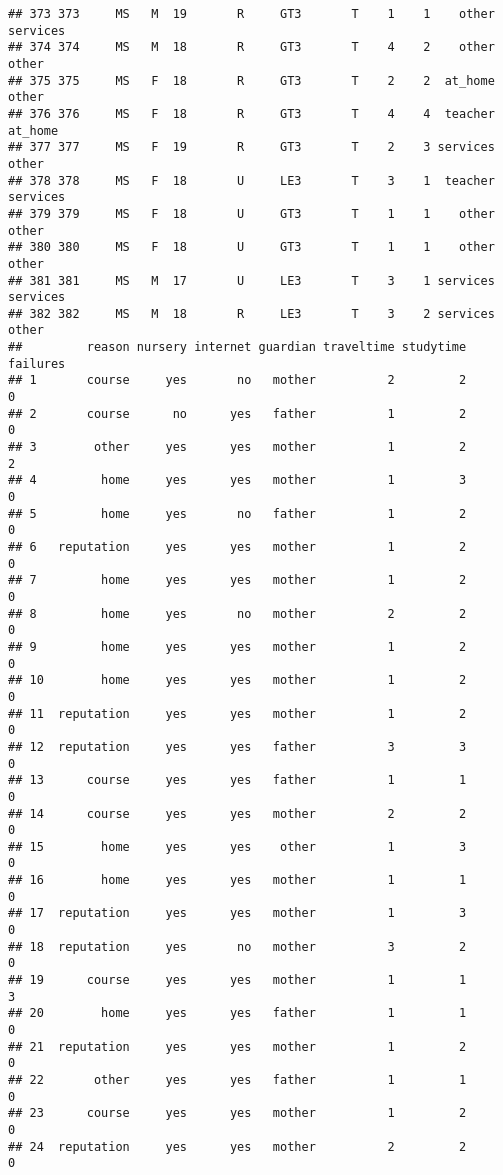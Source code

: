 \documentclass[]{article}
\begin{document}
\begin{verbatim}
## 373 373     MS   M  19       R     GT3       T    1    1    other services
## 374 374     MS   M  18       R     GT3       T    4    2    other    other
## 375 375     MS   F  18       R     GT3       T    2    2  at_home    other
## 376 376     MS   F  18       R     GT3       T    4    4  teacher  at_home
## 377 377     MS   F  19       R     GT3       T    2    3 services    other
## 378 378     MS   F  18       U     LE3       T    3    1  teacher services
## 379 379     MS   F  18       U     GT3       T    1    1    other    other
## 380 380     MS   F  18       U     GT3       T    1    1    other    other
## 381 381     MS   M  17       U     LE3       T    3    1 services services
## 382 382     MS   M  18       R     LE3       T    3    2 services    other
##         reason nursery internet guardian traveltime studytime failures
## 1       course     yes       no   mother          2         2        0
## 2       course      no      yes   father          1         2        0
## 3        other     yes      yes   mother          1         2        2
## 4         home     yes      yes   mother          1         3        0
## 5         home     yes       no   father          1         2        0
## 6   reputation     yes      yes   mother          1         2        0
## 7         home     yes      yes   mother          1         2        0
## 8         home     yes       no   mother          2         2        0
## 9         home     yes      yes   mother          1         2        0
## 10        home     yes      yes   mother          1         2        0
## 11  reputation     yes      yes   mother          1         2        0
## 12  reputation     yes      yes   father          3         3        0
## 13      course     yes      yes   father          1         1        0
## 14      course     yes      yes   mother          2         2        0
## 15        home     yes      yes    other          1         3        0
## 16        home     yes      yes   mother          1         1        0
## 17  reputation     yes      yes   mother          1         3        0
## 18  reputation     yes       no   mother          3         2        0
## 19      course     yes      yes   mother          1         1        3
## 20        home     yes      yes   father          1         1        0
## 21  reputation     yes      yes   mother          1         2        0
## 22       other     yes      yes   father          1         1        0
## 23      course     yes      yes   mother          1         2        0
## 24  reputation     yes      yes   mother          2         2        0

\end{verbatim}
\end{document}
